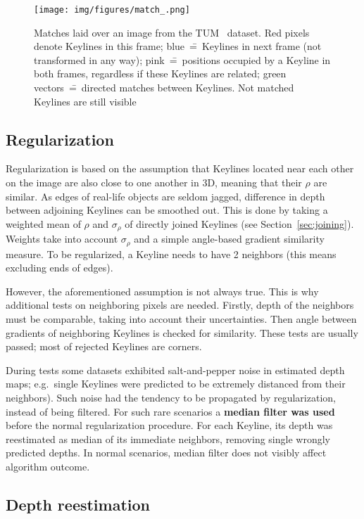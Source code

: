 \begin{figure}[ht]
	\centering\texttt{[image: img/figures/match\_.png]}
	\caption{ Matches laid over an image from the TUM~\cite{tum} dataset. Red pixels denote Keylines in this frame; blue~\==~Keylines in next frame (not transformed in any way); pink~\==~positions occupied by a Keyline in both frames, regardless if these Keylines are related; green vectors~\==~directed matches between Keylines. Not matched Keylines are still visible }
	\label{fig:match}
\end{figure}

\subsection{Regularization}
\label{sec:regul}

Regularization is based on the assumption that Keylines located near each other on the image are also close to one another in 3D, meaning that their $\rho$ are similar. As edges of real-life objects are seldom jagged, difference in depth between adjoining Keylines can be smoothed out. This is done by taking a weighted mean of $\rho$ and $\sigma_{\rho}$ of directly joined Keylines (see Section~\ref{sec:joining}). Weights take into account $\sigma_{\rho}$ and a simple angle-based gradient similarity measure. To be regularized, a Keyline needs to have 2 neighbors (this means excluding ends of edges).

However, the aforementioned assumption is not always true. This is why additional tests on neighboring pixels are needed. Firstly, depth of the neighbors must be comparable, taking into account their uncertainties. Then angle between gradients of neighboring Keylines is checked for similarity. These tests are usually passed; most of rejected Keylines are corners.

During tests some datasets exhibited salt-and-pepper noise in estimated depth maps; e.g.~single Keylines were predicted to be extremely distanced from their neighbors). Such noise had the tendency to be propagated by regularization, instead of being filtered. For such rare scenarios a \textbf{median filter was used} before the normal regularization procedure. For each Keyline, its depth was reestimated as median of its immediate neighbors, removing single wrongly predicted depths. In normal scenarios, median filter does not visibly affect algorithm outcome.

\subsection{Depth reestimation}
\label{sec:kalman}

